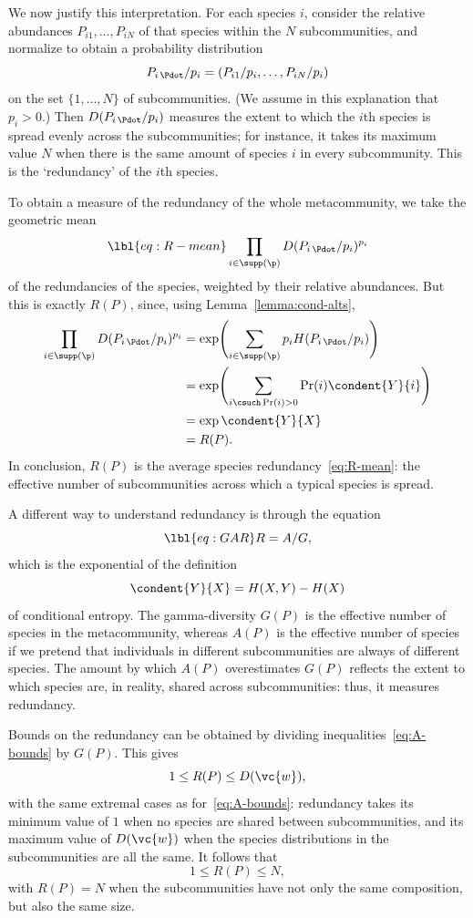 We now justify this interpretation.  For each species $i$, consider
the relative abundances $P_{i1}, \ldots, P_{iN}$ of that species within the
$N$ subcommunities, and normalize to obtain a probability distribution
\[
P_{i\,\Pdot}/p_i
=
(P_{i1}/p_i, \ldots, P_{iN}/p_i)
\]
on the set $\{1, \ldots, N\}$ of subcommunities.  (We assume in this
explanation that $p_i > 0$.)  Then $D(P_{i\,\Pdot}/p_i)$ measures the
extent to which the $i$th species is spread evenly across the
subcommunities; for instance, it takes its maximum value $N$ when there is
the same amount of species $i$ in every subcommunity.  This is the
`redundancy' of the $i$th species.  

To obtain a measure of the redundancy of the whole metacommunity, we take
the geometric mean
% 
\begin{equation}
\lbl{eq:R-mean}
\prod_{i \in \supp(\p)} D(P_{i\,\Pdot}/p_i)^{p_i}
\end{equation}
% 
of the redundancies of the species, weighted by their relative abundances.
But this is exactly $R(P)$, since, using
Lemma~\ref{lemma:cond-alts}, 
% 
\begin{align*}
\prod_{i \in \supp(\p)} D(P_{i\,\Pdot}/p_i)^{p_i}       &
=
\exp \Biggl( \sum_{i \in \supp(\p)} p_i H(P_{i\,\Pdot}/p_i) \Biggr) \\
&
=
\exp \Biggl( \sum_{i \csuch \Pr(i) > 0} \Pr(i) \condent{Y}{i} \Biggr)\\
&
=
\exp \condent{Y}{X}     \\
&
=
R(P).
\end{align*}
% 
In conclusion, $R(P)$ is the average species redundancy~\eqref{eq:R-mean}:
the effective number of subcommunities across which a typical species is
spread.

A different way to understand redundancy is through the equation
% 
\begin{equation}
\lbl{eq:GAR}
R = A/G,
\end{equation}
% 
which is the exponential of the definition 
\[
\condent{Y}{X} = H(X, Y) - H(X)
\]
of conditional entropy.  The gamma-diversity $G(P)$ is the effective number
of species in the metacommunity, whereas $A(P)$ is the effective number of
species if we pretend that individuals in different subcommunities are
always of different species.  The amount by which $A(P)$ overestimates
$G(P)$ reflects the extent to which species are, in reality, shared across
subcommunities: thus, it measures redundancy.  

Bounds on the redundancy can be obtained by dividing
inequalities~\eqref{eq:A-bounds} by $G(P)$.  This gives
\[
1 \leq R(P) \leq D(\vc{w}),
\]
with the same extremal cases as for~\eqref{eq:A-bounds}: redundancy takes
its minimum value of $1$ when no species are shared between
subcommunities, and its maximum value of $D(\vc{w})$ when the species
distributions in the subcommunities are all the same.  It follows that
\[
1 \leq R(P) \leq N,
\]
with $R(P) = N$ when the subcommunities have not only the same composition,
but also the same size.  


